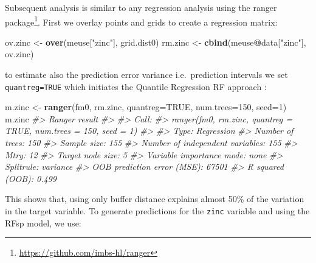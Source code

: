 \documentclass[graybox,natbib,nospthms,UStrade]{svmono}
\newenvironment{Shaded}{\begin{snugshade}}{\end{snugshade}}
\newcommand{\CommentTok}[1]{\textcolor[rgb]{0.37,0.37,0.37}{\textit{#1}}}
\newcommand{\DataTypeTok}[1]{\textcolor[rgb]{0.27,0.27,0.27}{#1}}
\newcommand{\DecValTok}[1]{\textcolor[rgb]{0.06,0.06,0.06}{#1}}
\newcommand{\KeywordTok}[1]{\textcolor[rgb]{0.27,0.27,0.27}{\textbf{#1}}}
\newcommand{\NormalTok}[1]{#1}
\newcommand{\OperatorTok}[1]{\textcolor[rgb]{0.43,0.43,0.43}{\textbf{#1}}}
\newcommand{\OtherTok}[1]{\textcolor[rgb]{0.37,0.37,0.37}{#1}}
\newcommand{\StringTok}[1]{\textcolor[rgb]{0.5,0.5,0.5}{#1}}
\renewcommand{\href}[2]{#2 (\url{#1})}
\renewcommand{\href}[2]{#2\footnote{\url{#1}}}
\begin{document}
Subsequent analysis is similar to any regression analysis using the \href{https://github.com/imbs-hl/ranger}{ranger package}. First we overlay points and grids to create a regression matrix:

\begin{Shaded}
\begin{Highlighting}[]
\NormalTok{ov.zinc <-}\StringTok{ }\KeywordTok{over}\NormalTok{(meuse[}\StringTok{"zinc"}\NormalTok{], grid.dist0)}
\NormalTok{rm.zinc <-}\StringTok{ }\KeywordTok{cbind}\NormalTok{(meuse}\OperatorTok{@}\NormalTok{data[}\StringTok{"zinc"}\NormalTok{], ov.zinc)}
\end{Highlighting}
\end{Shaded}

to estimate also the prediction error variance i.e.~prediction intervals we set \texttt{quantreg=TRUE} which initiates the Quantile Regression RF approach \citep{meinshausen2006quantile}:

\begin{Shaded}
\begin{Highlighting}[]
\NormalTok{m.zinc <-}\StringTok{ }\KeywordTok{ranger}\NormalTok{(fm0, rm.zinc, }\DataTypeTok{quantreg=}\OtherTok{TRUE}\NormalTok{, }\DataTypeTok{num.trees=}\DecValTok{150}\NormalTok{, }\DataTypeTok{seed=}\DecValTok{1}\NormalTok{)}
\NormalTok{m.zinc}
\CommentTok{#> Ranger result}
\CommentTok{#> }
\CommentTok{#> Call:}
\CommentTok{#>  ranger(fm0, rm.zinc, quantreg = TRUE, num.trees = 150, seed = 1) }
\CommentTok{#> }
\CommentTok{#> Type:                             Regression }
\CommentTok{#> Number of trees:                  150 }
\CommentTok{#> Sample size:                      155 }
\CommentTok{#> Number of independent variables:  155 }
\CommentTok{#> Mtry:                             12 }
\CommentTok{#> Target node size:                 5 }
\CommentTok{#> Variable importance mode:         none }
\CommentTok{#> Splitrule:                        variance }
\CommentTok{#> OOB prediction error (MSE):       67501 }
\CommentTok{#> R squared (OOB):                  0.499}
\end{Highlighting}
\end{Shaded}

This shows that, using only buffer distance explains almost 50\% of the variation in the target variable. To generate predictions for the \texttt{zinc} variable and using the RFsp model, we use:
\end{document}
